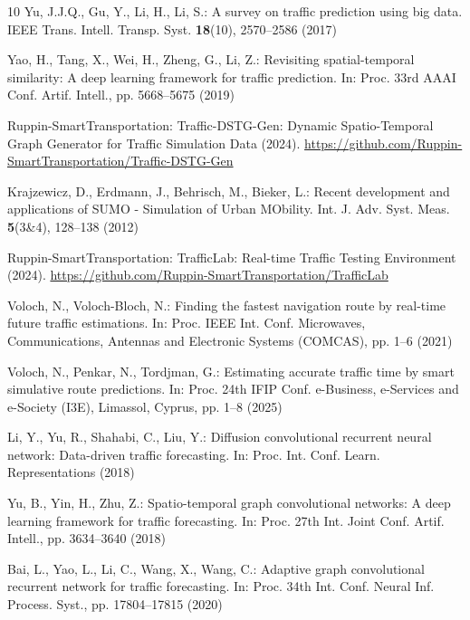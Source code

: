 \documentclass[runningheads]{template/llncs}
\begin{document}

\clearpage












\begin{thebibliography}{10}
Yu, J.J.Q., Gu, Y., Li, H., Li, S.: A survey on traffic prediction using big data. IEEE Trans. Intell. Transp. Syst. \textbf{18}(10), 2570--2586 (2017)

Yao, H., Tang, X., Wei, H., Zheng, G., Li, Z.: Revisiting spatial-temporal similarity: A deep learning framework for traffic prediction. In: Proc. 33rd AAAI Conf. Artif. Intell., pp. 5668--5675 (2019)

Ruppin-SmartTransportation: Traffic-DSTG-Gen: Dynamic Spatio-Temporal Graph Generator for Traffic Simulation Data (2024). \url{https://github.com/Ruppin-SmartTransportation/Traffic-DSTG-Gen}

Krajzewicz, D., Erdmann, J., Behrisch, M., Bieker, L.: Recent development and applications of SUMO - Simulation of Urban MObility. Int. J. Adv. Syst. Meas. \textbf{5}(3\&4), 128--138 (2012)

Ruppin-SmartTransportation: TrafficLab: Real-time Traffic Testing Environment (2024). \url{https://github.com/Ruppin-SmartTransportation/TrafficLab}

Voloch, N., Voloch-Bloch, N.: Finding the fastest navigation route by real-time future traffic estimations. In: Proc. IEEE Int. Conf. Microwaves, Communications, Antennas and Electronic Systems (COMCAS), pp. 1--6 (2021)

Voloch, N., Penkar, N., Tordjman, G.: Estimating accurate traffic time by smart simulative route predictions. In: Proc. 24th IFIP Conf. e-Business, e-Services and e-Society (I3E), Limassol, Cyprus, pp. 1--8 (2025)

Li, Y., Yu, R., Shahabi, C., Liu, Y.: Diffusion convolutional recurrent neural network: Data-driven traffic forecasting. In: Proc. Int. Conf. Learn. Representations (2018)

Yu, B., Yin, H., Zhu, Z.: Spatio-temporal graph convolutional networks: A deep learning framework for traffic forecasting. In: Proc. 27th Int. Joint Conf. Artif. Intell., pp. 3634--3640 (2018)

Bai, L., Yao, L., Li, C., Wang, X., Wang, C.: Adaptive graph convolutional recurrent network for traffic forecasting. In: Proc. 34th Int. Conf. Neural Inf. Process. Syst., pp. 17804--17815 (2020)
\end{thebibliography}
\end{document}
